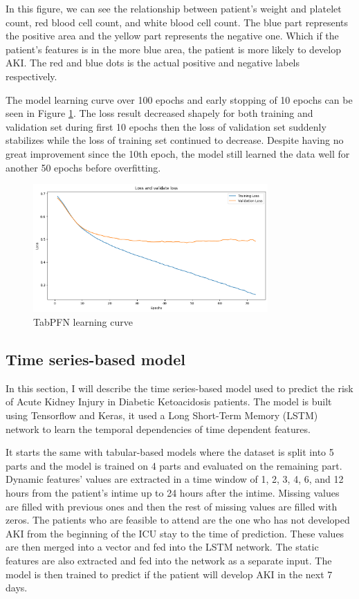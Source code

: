 \documentclass[../main.tex]{subfiles}
\begin{document}
In this figure, we can see the relationship between patient's weight and platelet count, red blood cell count, and white blood cell count.
The blue part represents the positive area and the yellow part represents the negative one. 
Which if the patient's features is in the more blue area, the patient is more likely to develop AKI. 
The red and blue dots is the actual positive and negative labels respectively.


The model learning curve over 100 epochs and early stopping of 10 epochs can be seen in Figure \ref{fig:tabpfn-learning-curve}.
The loss result decreased shapely for both training and validation set during first 10 epochs then the loss of validation set suddenly  stabilizes while the loss of training set continued to decrease.
Despite having no great improvement since the 10th epoch, the model still learned the data well for another 50 epochs before overfitting.
\begin{figure}[H]
    \centering
    \includegraphics[width=0.8\textwidth]{./Figure/tabpfn-loss-graph.png}
    \caption{TabPFN learning curve}
    \label{fig:tabpfn-learning-curve}
\end{figure}

\subsection{Time series-based model}

In this section, I will describe the time series-based model used to predict the risk of Acute Kidney Injury in Diabetic Ketoacidosis patients.
The model is built using Tensorflow and Keras, it used a Long Short-Term Memory (LSTM) network to learn the temporal dependencies of time dependent features.

It starts the same with tabular-based models where the dataset is split into 5 parts and the model is trained on 4 parts and evaluated on the remaining part.
Dynamic features' values are extracted in a time window of 1, 2, 3, 4, 6, and 12 hours from the patient's intime up to 24 hours after the intime.
Missing values are filled with previous ones and then the rest of missing values are filled with zeros.
The patients who are feasible to attend are the one who has not developed AKI from the beginning of the ICU stay to the time of prediction.
These values are then merged into a vector and fed into the LSTM network.
The static features are also extracted and fed into the network as a separate input.
The model is then trained to predict if the patient will develop AKI in the next 7 days.
\end{document}
